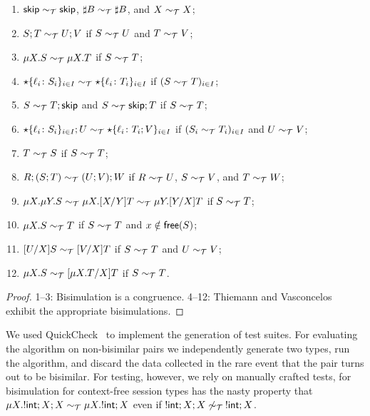 \begin{theorem}
\label{thm:properties_quickcheck}
  \begin{enumerate}
  \item $\mathsf{skip} \sim_\mathcal T \mathsf{skip}$,  $\sharp B \sim_\mathcal T \sharp B$, and
    $X \sim_\mathcal T X$;
  \item $S;T \sim_\mathcal T U;V$ if $S \sim_\mathcal T U$ and $T \sim_\mathcal T V$;
  \item $\mu X.S \sim_\mathcal T \mu X.T$ if $S \sim_\mathcal T T$;
  \item $\star\{\ell_i\colon S_i\}_{i\in I}\sim_\mathcal T
    \star\{\ell_i\colon T_i\}_{i\in I}$ if $(S \sim_\mathcal T T)_{i\in
      I}$;
  \item $S\sim_\mathcal T T;\mathsf{skip}$ and $S\sim_\mathcal T \mathsf{skip};T$ if $S \sim_\mathcal T T$;
  \item $\star\{\ell_i\colon S_i\}_{i\in I};U\sim_\mathcal T
    \star\{\ell_i\colon T_i;V\}_{i\in I}$ if $(S_i \sim_\mathcal T T_i)_{i\in
      I}$ and $U \sim_\mathcal T V$;
  \item $T \sim_\mathcal T S$ if $S \sim_\mathcal T T$;
  \item $R;(S;T) \sim_\mathcal T (U;V);W$ if $R \sim_\mathcal T U$, $S \sim_\mathcal T V$, and $T\sim_\mathcal T W$;
  \item
    $\mu X.\mu Y.S \sim_\mathcal T \mu X.[{X}/{Y}]T \sim_\mathcal T \mu Y.[{Y}/{X}]T$ if $S \sim_\mathcal T T$;
  \item $\mu X.S \sim_\mathcal T T$ if $S \sim_\mathcal T T$ and $x\notin\mathsf{free}(S)$;
  \item $[{U}/{X}]S\sim_\mathcal T [{V}/{X}]T$  if $S \sim_\mathcal T T$ and $U \sim_\mathcal T V$;
  \item $\mu X.S \sim_\mathcal T [{\mu X.T}/{X}]T$ if $S \sim_\mathcal T T$.
  \end{enumerate}
\end{theorem}
%
\begin{proof}
  1--3: Bisimulation is a congruence. 4--12: Thiemann and
  Vasconcelos~\cite{thiemann2016context} exhibit the appropriate
  bisimulations.
\end{proof}

We used QuickCheck~\cite{DBLP:conf/icfp/ClaessenH00} to implement the
generation of test suites. For evaluating the algorithm on
non-bisimilar pairs we independently generate two types, run the
algorithm, and discard the data collected in the rare event that the
pair turns out to be bisimilar.
%
For testing, however, we rely on manually crafted tests, for
bisimulation for context-free session types has the nasty property
that $\mu X. !\mathsf{int};X;X \sim_\mathcal T \mu X. !\mathsf{int};X$ even if
$!\mathsf{int};X;X \not\sim_\mathcal T\: !\mathsf{int};X$.

